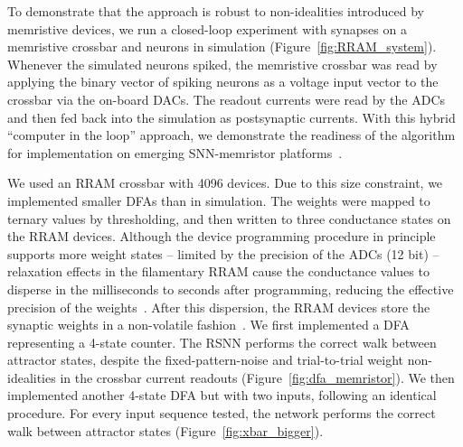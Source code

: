 To demonstrate that the approach is robust to non-idealities introduced by memristive devices,
we run a closed-loop experiment with synapses on a memristive crossbar and neurons in simulation (Figure~\ref{fig:RRAM_system}). Whenever the simulated neurons spiked, the memristive crossbar was read by applying the binary vector of spiking neurons as a voltage input vector to the crossbar via the on-board DACs. The readout currents were read by the ADCs and then fed back into the simulation as postsynaptic currents.
With this hybrid ``computer in the loop'' approach, we demonstrate the readiness of the algorithm for implementation on emerging SNN-memristor platforms~\cite{greatorex_texel_2024}.


We used an RRAM crossbar with 4096 devices. Due to this size constraint, we implemented smaller DFAs than in simulation. The weights were mapped to ternary values by thresholding, and then written to three conductance states on the RRAM devices. Although the device programming procedure in principle supports more weight states -- limited by the precision of the ADCs (12 bit) -- relaxation effects in the filamentary RRAM cause the conductance values to disperse in the milliseconds to seconds after programming, reducing the effective precision of the weights~\cite{rram_relaxation_2015, rram_relaxation_2016}. After this dispersion, the RRAM devices store the synaptic weights in a non-volatile fashion~\cite{chen_scaling_2024}.
We first implemented a DFA representing a 4-state counter.
The RSNN performs the correct walk between attractor states, despite the fixed-pattern-noise and trial-to-trial weight non-idealities in the crossbar current readouts \mbox{(Figure \ref{fig:dfa_memristor})}. We then implemented another 4-state DFA but with two inputs, following an identical procedure. For every input sequence tested, the network performs the correct walk between attractor states \mbox{(Figure \ref{fig:xbar_bigger})}.




